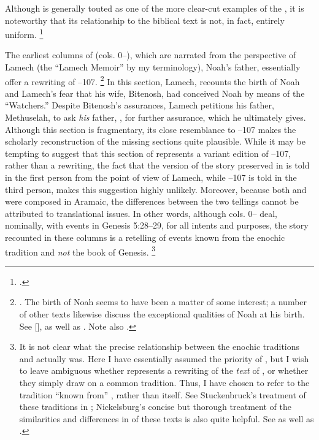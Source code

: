 Although \ga is generally touted as one of the more clear-cut examples of the \rwb, it is noteworthy that its relationship to the biblical text is not, in fact, entirely uniform.%
    \footnote{\Cite[333]{bernstein_berthelot-etal2010}.}


The earliest columns of \ga (cols. 0--), which are narrated from the perspective of Lamech (the ``Lamech Memoir'' by my terminology), Noah's father, essentially offer a rewriting of --107.%
    \footnote{\Cite[174]{nickelsburg2005}. The birth of Noah seems to have been a matter of some interest; a number of other texts likewise discuss the exceptional qualities of Noah at his birth. See [],  as well as \cite{vanderkam_kapera1992}. Note also \cite{stuckenbruck_berthelot-etal2010}.}
In this section, Lamech, recounts the birth of Noah and Lamech's fear that his wife, Bitenosh, had conceived Noah by means of the  ``Watchers.'' Despite Bitenosh's assurances, Lamech petitions his father, Methuselah, to ask \emph{his} father, \enoch, for further assurance, which he ultimately gives. Although this section is fragmentary, its close resemblance to --107 makes the scholarly reconstruction of the missing sections quite plausible. While it may be tempting to suggest that this section of \ga represents a variant edition of --107, rather than a rewriting, the fact that the version of the story preserved in \ga is told in the first person from the point of view of Lamech, while --107 is told in the third person, makes this suggestion highly unlikely. Moreover, because both \firstenoch and \ga were composed in Aramaic, the differences between the two tellings cannot be attributed to translational issues. In other words, although cols. 0-- deal, nominally, with events in Genesis 5:28--29, for all intents and purposes, the story recounted in these columns is a retelling of events known from the enochic tradition and \emph{not} the book of Genesis.%
    \footnote{It is not clear what the precise relationship between the enochic traditions and \ga actually was. Here I have essentially assumed the priority of \firstenoch, but I wish to leave ambiguous whether \ga represents a rewriting of the \emph{text} of \firstenoch, or whether they simply draw on a common tradition. Thus, I have chosen to refer to the tradition ``known from'' \firstenoch, rather than \firstenoch itself. See Stuckenbruck's treatment of these traditions in \cite*{stuckenbruck_berthelot-etal2010}; Nickelsburg's concise but thorough treatment of the similarities and differences in of these texts is also quite helpful. See \cite[173--174]{nickelsburg2005} as well as \cite[122--123]{fitzmyer2004}.} 


